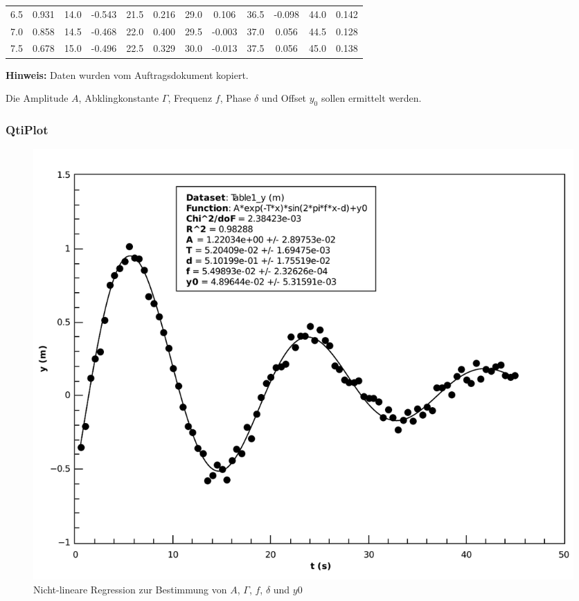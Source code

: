 \begin{center}
\begin{threeparttable}
\begin{tabular}{*{12}{c}}
            6.5     & 0.931     & 14.0      & -0.543    & 21.5     & 0.216      & 29.0      & 0.106    & 36.5       & -0.098    & 44.0      & 0.142   \\
            7.0     & 0.858     & 14.5      & -0.468    & 22.0     & 0.400      & 29.5      & -0.003   & 37.0       & 0.056     & 44.5      & 0.128   \\
            7.5     & 0.678     & 15.0      & -0.496    & 22.5     & 0.329      & 30.0      & -0.013   & 37.5       & 0.056     & 45.0      & 0.138   \\
            \bottomrule
        \end{tabular}
        \begin{tablenotes}
            \small
            \item \textbf{Hinweis:} Daten wurden vom Auftragsdokument kopiert.
        \end{tablenotes}
        \label{tab:pendel}
    \end{threeparttable}
\end{center}

Die Amplitude $A$, Abklingkonstante $\Gamma$, Frequenz $f$, Phase $\delta$ und Offset $y_0$ sollen
ermittelt werden.


\subsubsection*{QtiPlot}

\begin{figure}[H]
    \center
    \includegraphics[width=.85\textwidth]{qtiplot/pendel}
    \caption{Nicht-lineare Regression zur Bestimmung von $A$, $\Gamma$, $f$, $\delta$ und $y0$}
    \label{fig:pendel}
\end{figure}

